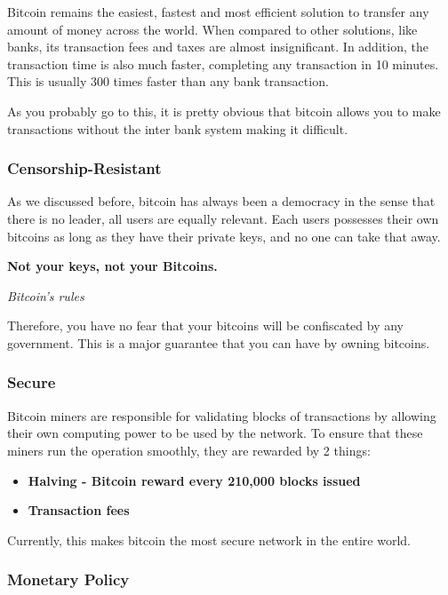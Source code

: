 \documentclass{article}
\newcommand\tab[1][1cm]{\hspace*{#1}}
\begin{document}
Bitcoin remains the easiest, fastest and most efficient solution to transfer any amount of money across the world. When compared to other solutions, like banks, its transaction fees and taxes are almost insignificant. In addition, the transaction time is also much faster, completing any transaction in 10 minutes. This is usually 300 times faster than any bank transaction. 

As you probably go to this, it is pretty obvious that bitcoin allows you to make transactions without the inter bank system making it difficult.

\subsubsection{Censorship-Resistant}

\tab As we discussed before, bitcoin has always been a democracy in the sense that there is no leader, all users are equally relevant. Each users possesses their own bitcoins as long as they have their private keys, and no one can take that away. 

\renewcommand{\epigraphflush}{center}
\epigraph{\textbf{Not your keys, not your Bitcoins.}}{\textit{Bitcoin's rules}}

Therefore, you have no fear that your bitcoins will be confiscated by any government. This is a major guarantee that you can have by owning bitcoins.

\subsubsection{Secure}

\tab Bitcoin miners are responsible for validating blocks of transactions by allowing their own computing power to be used by the network. To ensure that these miners run the operation smoothly, they are rewarded by 2 things:

\begin{itemize}
    \item \textbf{Halving - Bitcoin reward every 210,000 blocks issued}
    \item \textbf{Transaction fees}
\end{itemize}

 Currently, this makes bitcoin the most secure network in the entire world. 
 
\subsubsection{Monetary Policy}
\end{document}
